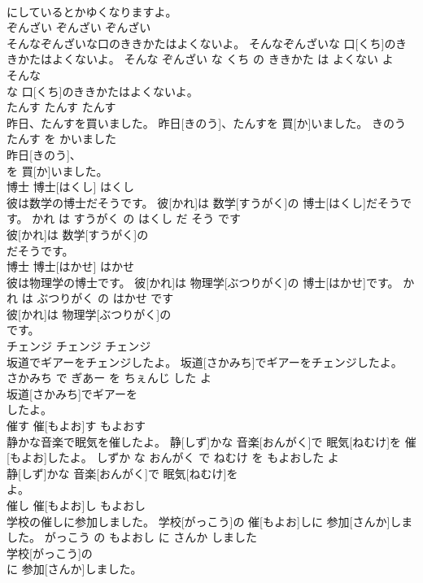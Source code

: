 \documentclass[8pt]{extreport}
\begin{document}
\begin{CJK}{UTF8}{min}
\\	にしているとかゆくなりますよ。			
\\	ぞんざい	ぞんざい	ぞんざい	
\\	そんなぞんざいな口のききかたはよくないよ。	そんなぞんざいな 口[くち]のききかたはよくないよ。	そんな ぞんざい な くち の ききかた は よくない よ	
\\	そんな
\\	な 口[くち]のききかたはよくないよ。			
\\	たんす	たんす	たんす	
\\	昨日、たんすを買いました。	昨日[きのう]、たんすを 買[か]いました。	きのう たんす を かいました	
\\	昨日[きのう]、
\\	を 買[か]いました。			
\\	博士	博士[はくし]	はくし	
\\	彼は数学の博士だそうです。	彼[かれ]は 数学[すうがく]の 博士[はくし]だそうです。	かれ は すうがく の はくし だ そう です	
\\	彼[かれ]は 数学[すうがく]の
\\	だそうです。			
\\	博士	博士[はかせ]	はかせ	
\\	彼は物理学の博士です。	彼[かれ]は 物理学[ぶつりがく]の 博士[はかせ]です。	かれ は ぶつりがく の はかせ です	
\\	彼[かれ]は 物理学[ぶつりがく]の
\\	です。			
\\	チェンジ	チェンジ	チェンジ	
\\	坂道でギアーをチェンジしたよ。	坂道[さかみち]でギアーをチェンジしたよ。	さかみち で ぎあー を ちぇんじ した よ	
\\	坂道[さかみち]でギアーを
\\	したよ。			
\\	催す	催[もよお]す	もよおす	
\\	静かな音楽で眠気を催したよ。	静[しず]かな 音楽[おんがく]で 眠気[ねむけ]を 催[もよお]したよ。	しずか な おんがく で ねむけ を もよおした よ	
\\	静[しず]かな 音楽[おんがく]で 眠気[ねむけ]を
\\	よ。			
\\	催し	催[もよお]し	もよおし	
\\	学校の催しに参加しました。	学校[がっこう]の 催[もよお]しに 参加[さんか]しました。	がっこう の もよおし に さんか しました	
\\	学校[がっこう]の
\\	に 参加[さんか]しました。			

\end{CJK}
\end{document}
